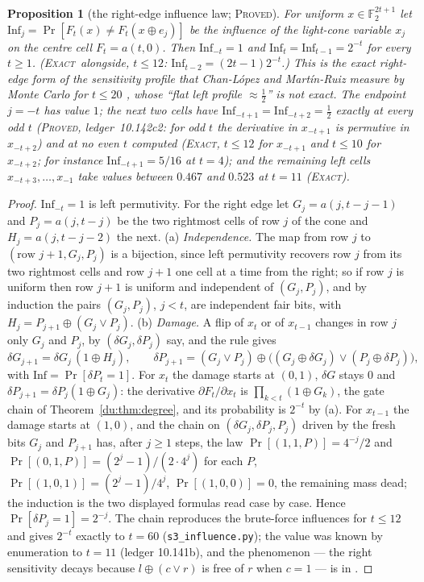 \documentclass[11pt]{article}
\newtheorem{proposition}[theorem]{Proposition}
\theoremstyle{definition}
\theoremstyle{remark}
\newcommand{\F}{\mathbb{F}_2}
\newcommand{\PROVED}{\textsc{Proved}}
\newcommand{\EXACT}{\textsc{Exact}}
\begin{document}
\begin{proposition}[the right-edge influence law; \PROVED]\label{du:prop:influence}
For uniform $x\in\F^{2t+1}$ let $\mathrm{Inf}_j=\Pr[F_t(x)\ne F_t(x\oplus e_j)]$ be the influence of the
light-cone variable $x_j$ on the centre cell $F_t=a(t,0)$. Then $\mathrm{Inf}_{-t}=1$ and
$\mathrm{Inf}_{t}=\mathrm{Inf}_{t-1}=2^{-t}$ for every $t\ge1$. (\EXACT\ alongside, $t\le12$:
$\mathrm{Inf}_{t-2}=(2t-1)2^{-t}$.) This is the exact right-edge form of the sensitivity profile that
Chan-L\'opez and Mart\'in-Ruiz measure by Monte Carlo for $t\le20$ \cite[\S8.2]{CLMR}, whose ``flat left
profile $\approx\tfrac12$'' is not exact. The endpoint $j=-t$ has value $1$; the next two cells have $\mathrm{Inf}_{-t+1}=\mathrm{Inf}_{-t+2}=\tfrac12$ exactly at every odd $t$ (\PROVED, ledger~10.142c2: for odd $t$ the derivative in $x_{-t+1}$ is permutive in $x_{-t+2}$) and at no even $t$ computed (\EXACT, $t\le12$ for $x_{-t+1}$ and $t\le10$ for $x_{-t+2}$; for instance $\mathrm{Inf}_{-t+1}=5/16$ at $t=4$); and the remaining left cells $x_{-t+3},\dots,x_{-1}$ take values between $0.467$ and $0.523$ at $t=11$ (\EXACT).
\end{proposition}
\begin{proof}
$\mathrm{Inf}_{-t}=1$ is left permutivity. For the right edge let $G_j=a(j,t-j-1)$ and $P_j=a(j,t-j)$ be
the two rightmost cells of row $j$ of the cone and $H_j=a(j,t-j-2)$ the next. (a) \emph{Independence.}
The map from row $j$ to $(\text{row }j+1,G_j,P_j)$ is a bijection, since left permutivity recovers row
$j$ from its two rightmost cells and row $j+1$ one cell at a time from the right; so if row $j$ is
uniform then row $j+1$ is uniform and independent of $(G_j,P_j)$, and by induction the pairs $(G_j,P_j)$,
$j<t$, are independent fair bits, with $H_j=P_{j+1}\oplus(G_j\vee P_j)$. (b) \emph{Damage.} A flip of
$x_t$ or of $x_{t-1}$ changes in row $j$ only $G_j$ and $P_j$, by $(\delta G_j,\delta P_j)$ say, and the
rule gives
\[
\delta G_{j+1}=\delta G_j\,(1\oplus H_j),\qquad
\delta P_{j+1}=(G_j\vee P_j)\oplus\bigl((G_j\oplus\delta G_j)\vee(P_j\oplus\delta P_j)\bigr),
\]
with $\mathrm{Inf}=\Pr[\delta P_t=1]$. For $x_t$ the damage starts at $(0,1)$, $\delta G$ stays $0$ and
$\delta P_{j+1}=\delta P_j(1\oplus G_j)$: the derivative $\partial F_t/\partial x_t$ is
$\prod_{k<t}(1\oplus G_k)$, the gate chain of Theorem~\ref{du:thm:degree}, and its probability is
$2^{-t}$ by (a). For $x_{t-1}$ the damage starts at $(1,0)$, and the chain on
$(\delta G_j,\delta P_j,P_j)$ driven by the fresh bits $G_j$ and $P_{j+1}$ has, after $j\ge1$ steps, the
law $\Pr[(1,1,P)]=4^{-j}/2$ and $\Pr[(0,1,P)]=(2^{j}-1)/(2\cdot4^{j})$ for each $P$,
$\Pr[(1,0,1)]=(2^{j}-1)/4^{j}$, $\Pr[(1,0,0)]=0$, the remaining mass dead; the induction is the two
displayed formulas read case by case. Hence $\Pr[\delta P_j=1]=2^{-j}$. The chain reproduces the
brute-force influences for $t\le12$ and gives $2^{-t}$ exactly to $t=60$ (\texttt{s3\_influence.py});
the value was known by enumeration to $t=11$ (ledger 10.141b), and the phenomenon --- the right
sensitivity decays because $l\oplus(c\vee r)$ is free of $r$ when $c=1$ --- is in \cite[\S8.2]{CLMR}.
\end{proof}
\end{document}
